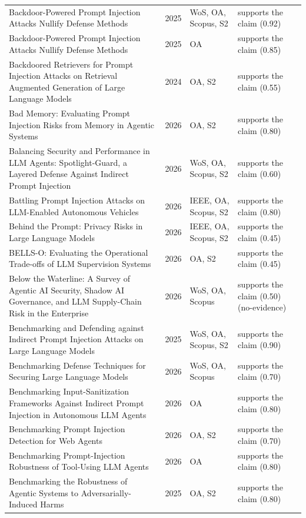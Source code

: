 \begin{longtable}{@{}%
  >{\raggedright\arraybackslash}p{}c%
  >{\raggedright\arraybackslash}p{}%
  >{\raggedright\arraybackslash}p{}@{}}
Backdoor-Powered Prompt Injection Attacks Nullify Defense Methods & 2025 & WoS, OA, Scopus, S2 & supports the claim (0.92) \\
Backdoor-Powered Prompt Injection Attacks Nullify Defense Methods & 2025 & OA & supports the claim (0.85) \\
Backdoored Retrievers for Prompt Injection Attacks on Retrieval Augmented Generation of Large Language Models & 2024 & OA, S2 & supports the claim (0.55) \\
Bad Memory: Evaluating Prompt Injection Risks from Memory in Agentic Systems & 2026 & OA, S2 & supports the claim (0.80) \\
Balancing Security and Performance in LLM Agents: Spotlight-Guard, a Layered Defense Against Indirect Prompt Injection & 2026 & WoS, OA, Scopus, S2 & supports the claim (0.60) \\
Battling Prompt Injection Attacks on LLM-Enabled Autonomous Vehicles & 2026 & IEEE, OA, Scopus, S2 & supports the claim (0.80) \\
Behind the Prompt: Privacy Risks in Large Language Models & 2026 & IEEE, OA, Scopus, S2 & supports the claim (0.45) \\
BELLS-O: Evaluating the Operational Trade-offs of LLM Supervision Systems & 2026 & OA, S2 & supports the claim (0.45) \\
Below the Waterline: A Survey of Agentic AI Security, Shadow AI Governance, and LLM Supply-Chain Risk in the Enterprise & 2026 & WoS, OA, Scopus & supports the claim (0.50) (no-evidence) \\
Benchmarking and Defending against Indirect Prompt Injection Attacks on Large Language Models & 2025 & WoS, OA, Scopus, S2 & supports the claim (0.90) \\
Benchmarking Defense Techniques for Securing Large Language Models & 2026 & WoS, OA, Scopus & supports the claim (0.70) \\
Benchmarking Input-Sanitization Frameworks Against Indirect Prompt Injection in Autonomous LLM Agents & 2026 & OA & supports the claim (0.80) \\
Benchmarking Prompt Injection Detection for Web Agents & 2026 & OA, S2 & supports the claim (0.70) \\
Benchmarking Prompt-Injection Robustness of Tool-Using LLM Agents & 2026 & OA & supports the claim (0.80) \\
Benchmarking the Robustness of Agentic Systems to Adversarially-Induced Harms & 2025 & OA, S2 & supports the claim (0.80) \\

\end{longtable}
